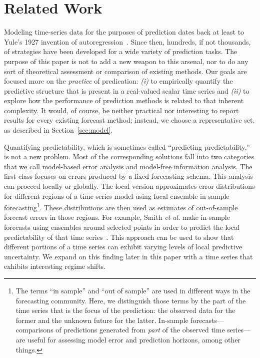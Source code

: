 \section{Related Work }\label{sec:related}

Modeling time-series data for the purposes of prediction dates back at
least to Yule's 1927 invention of autoregression~\cite{Yule27}.  Since
then, hundreds, if not thousands, of strategies have been developed
for a wide variety of prediction tasks.  The purpose of this paper is
not to add a new weapon to this arsenal, nor to do any sort of
theoretical assessment or comparison of existing methods.  Our goals
are focused more on the \emph{practice} of predication: \emph{(i)} to
empirically quantify the predictive structure that is present in a
real-valued scalar time series and \emph{(ii)} to explore how the
performance of prediction methods is related to that inherent
complexity.  It would, of course, be neither practical nor interesting
to report results for every existing forecast method; instead, we
choose a representative set, as described in Section~\ref{sec:model}.

Quantifying predictability, which is sometimes called ``predicting
predictability,'' is not a new problem.  Most of the corresponding
solutions fall into two categories that we call model-based error
analysis and model-free information analysis.
%
%
%
The first class focuses on errors produced by a fixed forecasting
schema.  This analysis can proceed locally or globally.  The local
version approximates error distributions for different regions of a
time-series model using local ensemble in-sample
forecasting\footnote{The terms ``in sample'' and ``out of sample'' are
  used in different ways in the forecasting community.  Here, we
  distinguish those terms by the part of the time series that is the
  focus of the prediction: the observed data for the former and the
  unknown future for the latter.  In-sample forecasts---comparisons of
  predictions generated from \emph{part} of the observed time
  series---are useful for assessing model error and prediction
  horizons, among other things.}.
%
These distributions are then used as estimates of out-of-sample
forecast errors in those regions.  For example, Smith \emph{et al.}
make in-sample forecasts using ensembles around selected points in
order to predict the local predictability of that time
series~\cite{Smith199250}.  This approach can be used to show that
different portions of a time series can exhibit varying levels of
local predictive uncertainty.  We expand on this finding later in this
paper with a time series that exhibits interesting regime shifts.

